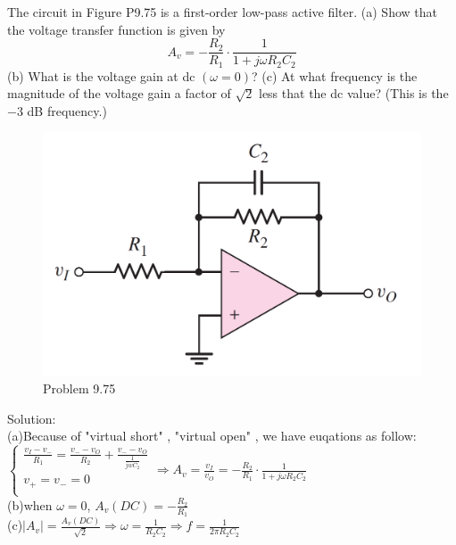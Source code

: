 \documentclass[a4paper,11pt,UTF8]{article}
\begin{document}
 The circuit in Figure P9.75 is a first-order low-pass active filter. (a) Show
that the voltage transfer function is given by
$$A_v =-\frac{R_2}{R_1}\cdot\frac{1}{1 + j\omega R_2C_2}$$
(b) What is the voltage gain at dc $(\omega = 0)$? (c) At what frequency is the
magnitude of the voltage gain a factor of
$\sqrt{2}$ less that the dc value? (This is
the $-3$ dB frequency.)
\begin{figure}[H] %
	\centering %
	\includegraphics[scale=0.15]{MD9.75.png} %
	\caption{Problem 9.75}
\end{figure}
\noindent Solution:\\
(a)Because of "virtual short" , "virtual open" , we have euqations as follow:\\
$\begin{cases}
	\displaystyle\frac{v_{I}-v_-}{R_1}=\frac{v_{-}-v_O}{R_2}+\frac{v_--v_O}{\displaystyle\frac1{jwC_2}}\\
	\displaystyle v_+=v_-=0\\
\end{cases}\Rightarrow \displaystyle A_v =\frac{v_I}{v_O}=-\frac{R_2}{R_1}\cdot\frac{1}{1 + j\omega R_2C_2}$\\
(b)when $\omega = 0$, $\displaystyle A_v(DC)=-\frac{R_2}{R_1}$\\
(c)$\displaystyle |A_v| = \frac{A_v(DC)}{\sqrt{2}}\Rightarrow\omega=\frac{1}{R_2C_2}\Rightarrow f=\frac{1}{2\pi R_2C_2}$
\end{document}
